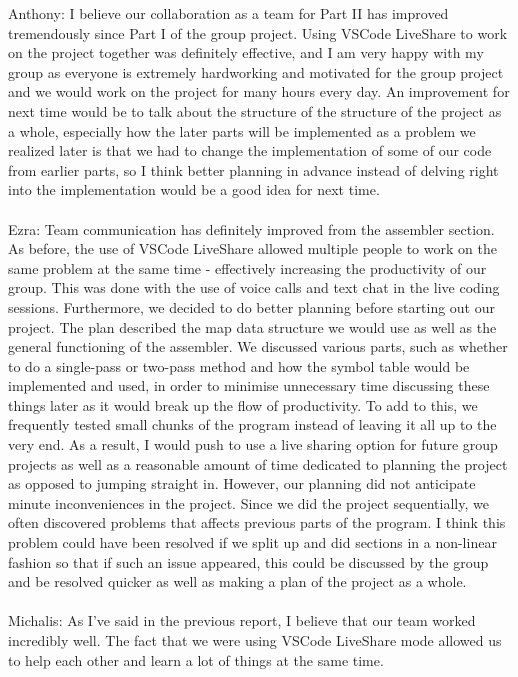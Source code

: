 \documentclass[a4paper]{article}
\begin{document}
Anthony: I believe our collaboration as a team for Part II has improved tremendously since Part I of the group project. Using VSCode 
LiveShare to work on the project together was definitely effective, and I am very happy with my group as everyone is extremely 
hardworking and motivated for the group project and we would work on the project for many hours every day. An improvement for 
next time would be to talk about the structure of the structure of the project as a whole, especially how the later parts will be implemented as 
a problem we realized later is that we had to change the implementation of some of our code from earlier parts, so I think better 
planning in advance instead of delving right into the implementation would be a good idea for next time. 
\\ \\
Ezra: Team communication has definitely improved from the assembler section. As before, the use of VSCode LiveShare allowed multiple
people to work on the same problem at the same time - effectively increasing the productivity of our group. This was done with the use
of voice calls and text chat in the live coding sessions. Furthermore, we decided to do better planning before starting out our project. 
The plan described the map data structure we would use as well as the general functioning of the assembler. We discussed various parts, such
as whether to do a single-pass or two-pass method and how the symbol table would be implemented and used, in order to minimise unnecessary time
discussing these things later as it would break up the flow of productivity. To add to this, we frequently tested small chunks of the program
instead of leaving it all up to the very end. As a result, I would push to use a live sharing option for future group projects as 
well as a reasonable amount of time dedicated to planning the project as opposed to jumping straight in. However, our planning
did not anticipate minute inconveniences in the project. Since we did the project sequentially, we often discovered problems that affects previous
parts of the program. I think this problem could have been resolved if we split up and did sections in a non-linear fashion
so that if such an issue appeared, this could be discussed by the group and be resolved quicker as well as making a plan of the project as a whole.
\\ \\
Michalis: As I've said in the previous report, I believe that our team worked incredibly well. The fact that 
we were using VSCode LiveShare mode allowed us to help each other and learn a lot of things at the same time. 
\end{document}
